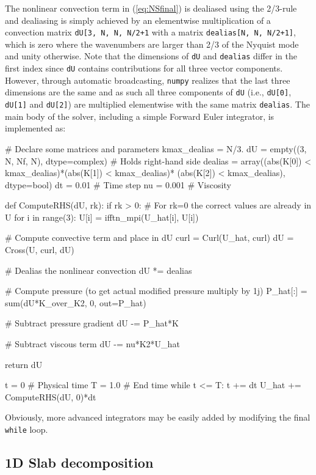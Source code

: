\documentclass[11pt, oneside]{article}
\newcommand{\inpyth}{\lstinline[style=pythonstyle, basicstyle=\ttfamily]} %[]%
\begin{document}
The nonlinear convection term in (\ref{eq:NSfinal}) is dealiased using the 2/3-rule and dealiasing is simply achieved by an elementwise multiplication of a convection matrix \inpyth{dU[3, N, N, N/2+1} with a matrix \inpyth{dealias[N, N, N/2+1]}, which is zero where the wavenumbers are larger than 2/3 of the Nyquist mode and unity otherwise. Note that the dimensions of \inpyth{dU} and \inpyth{dealias} differ in the first index since \inpyth{dU} contains contributions for all three vector components. However, through automatic broadcasting, \texttt{numpy} realizes that the last three dimensions are the same and as such all three components of \inpyth{dU} (i.e.,  \inpyth{dU[0]}, \inpyth{dU[1]} and  \inpyth{dU[2]}) are multiplied elementwise with the same matrix \inpyth{dealias}. The main body of the solver, including a simple Forward Euler integrator, is implemented as:
\begin{python}
# Declare some matrices and parameters
kmax_dealias = N/3.
dU = empty((3, N, Nf, N), dtype=complex)  # Holds right-hand side
dealias = array((abs(K[0]) < kmax_dealias)*(abs(K[1]) < kmax_dealias)*
                (abs(K[2]) < kmax_dealias), dtype=bool)
dt = 0.01    # Time step
nu = 0.001   # Viscosity

def ComputeRHS(dU, rk):
    if rk > 0: # For rk=0 the correct values are already in U
        for i in range(3):
            U[i] = ifftn_mpi(U_hat[i], U[i])

    # Compute convective term and place in dU
    curl = Curl(U_hat, curl)
    dU = Cross(U, curl, dU)

    # Dealias the nonlinear convection
    dU *= dealias

    # Compute pressure (to get actual modified pressure multiply by 1j)
    P_hat[:] = sum(dU*K_over_K2, 0, out=P_hat)

    # Subtract pressure gradient
    dU -= P_hat*K

    # Subtract viscous term
    dU -= nu*K2*U_hat

    return dU

t = 0        # Physical time
T = 1.0      # End time
while t <= T:
    t += dt
    U_hat += ComputeRHS(dU, 0)*dt
\end{python}
Obviously, more advanced integrators may be easily added by modifying the final \inpyth{while} loop.

\subsection{1D Slab decomposition}
\label{slab1D}
\end{document}
